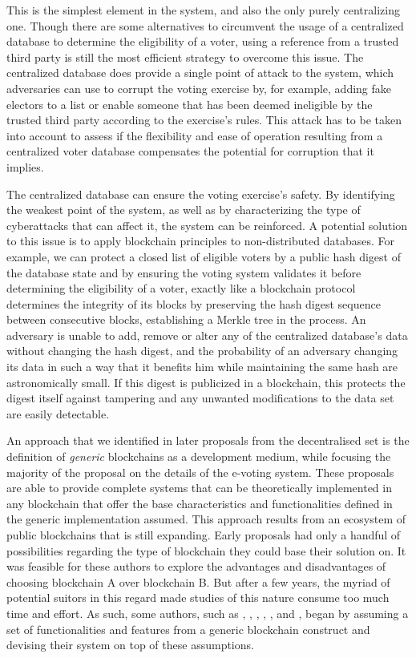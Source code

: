 This is the simplest element in the system, and also the only purely centralizing one. Though there are some alternatives to circumvent the usage of a centralized database to determine the eligibility of a voter, using a reference from a trusted third party is still the most efficient strategy to overcome this issue. The centralized database does provide a single point of attack to the system, which adversaries can use to corrupt the voting exercise by, for example, adding fake electors to a list or enable someone that has been deemed ineligible by the trusted third party according to the exercise's rules. This attack has to be taken into account to assess if the flexibility and ease of operation resulting from a centralized voter database compensates the potential for corruption that it implies.
\par
The centralized database can ensure the voting exercise's safety. By identifying the weakest point of the system, as well as by characterizing the type of cyberattacks that can affect it, the system can be reinforced. A potential solution to this issue is to apply blockchain principles to non-distributed databases. For example, we can protect a closed list of eligible voters by a public hash digest of the database state and by ensuring the voting system validates it before determining the eligibility of a voter, exactly like a blockchain protocol determines the integrity of its blocks by preserving the hash digest sequence between consecutive blocks, establishing a Merkle tree in the process. An adversary is unable to add, remove or alter any of the centralized database's data without changing the hash digest, and the probability of an adversary changing its data in such a way that it benefits him while maintaining the same hash are astronomically small. If this digest is publicized in a blockchain, this protects the digest itself against tampering and any unwanted modifications to the data set are easily detectable.
\par


An approach that we identified in later proposals from the decentralised set is the definition of \textit{generic} blockchains as a development medium, while focusing the majority of the proposal on the details of the e-voting system. These proposals are able to provide complete systems that can be theoretically implemented in any blockchain that offer the base characteristics and functionalities defined in the generic implementation assumed. This approach results from an ecosystem of public blockchains that is still expanding. Early proposals had only a handful of possibilities regarding the type of blockchain they could base their solution on. It was feasible for these authors to explore the advantages and disadvantages of choosing blockchain A over blockchain B. But after a few years, the myriad of potential suitors in this regard made studies of this nature consume too much time and effort. As such, some authors, such as \cite{Adiputra2019}, \cite{Chaieb2019}, \cite{Yang2020}, \cite{Sadia2020}, \cite{Zaghloul2020}, and \cite{Zhang2020}, began by assuming a set of functionalities and features from a generic blockchain construct and devising their system on top of these assumptions.
\par

